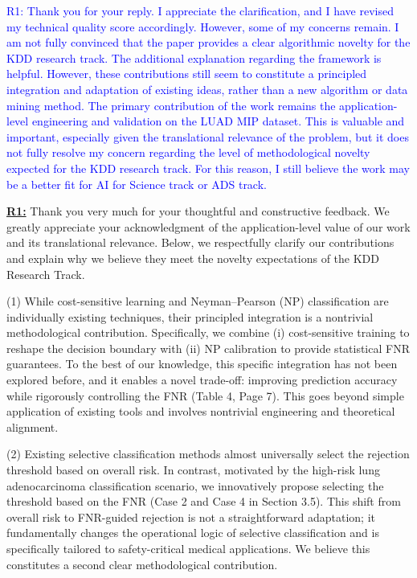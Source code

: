 \documentclass[UTF8,12pt]{article}
\begin{document}
\textcolor{blue}{R1: Thank you for your reply. I appreciate the clarification, and I have revised my technical quality score accordingly. However, some of my concerns remain. I am not fully convinced that the paper provides a clear algorithmic novelty for the KDD research track. The additional explanation regarding the framework is helpful. However, these contributions still seem to constitute a principled integration and adaptation of existing ideas, rather than a new algorithm or data mining method. The primary contribution of the work remains the application-level engineering and validation on the LUAD MIP dataset. This is valuable and important, especially given the translational relevance of the problem, but it does not fully resolve my concern regarding the level of methodological novelty expected for the KDD research track. For this reason, I still believe the work may be a better fit for AI for Science track or ADS track.}

\underline{{\bf R1:}} Thank you very much for your thoughtful and constructive feedback. We greatly appreciate your acknowledgment of the application-level value of our work and its translational relevance. Below, we respectfully clarify our contributions and explain why we believe they meet the novelty expectations of the KDD Research Track.

(1) While cost-sensitive learning and Neyman–Pearson (NP) classification are individually existing techniques, their principled integration is a nontrivial methodological contribution. Specifically, we combine (i) cost-sensitive training to reshape the decision boundary with (ii) NP calibration to provide statistical FNR guarantees. To the best of our knowledge, this specific integration has not been explored before, and it enables a novel trade-off: improving prediction accuracy while rigorously controlling the FNR (Table 4, Page 7). This goes beyond simple application of existing tools and involves nontrivial engineering and theoretical alignment.

(2) Existing selective classification methods almost universally select the rejection threshold based on overall risk. In contrast, motivated by the high-risk lung adenocarcinoma classification scenario, we innovatively propose selecting the threshold based on the FNR (Case 2 and Case 4 in Section 3.5). This shift from overall risk to FNR-guided rejection is not a straightforward adaptation; it fundamentally changes the operational logic of selective classification and is specifically tailored to safety-critical medical applications. We believe this constitutes a second clear methodological contribution.
\end{document}
